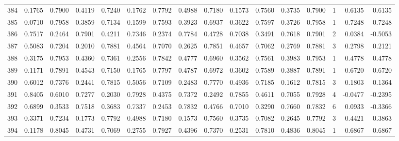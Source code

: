 \begin{tabular}{lrrrrrrrrrrrrrrr}
384 &      0.1765 &  0.7900 &  0.4119 &  0.7240 &  0.1762 &  0.7792 &  0.4988 &  0.7180 &  0.1573 &  0.7560 &   0.3735 &     0.7900 &      1 &                    0.6135 &                     0.6135 \\
385 &      0.0710 &  0.7958 &  0.3859 &  0.7134 &  0.1599 &  0.7593 &  0.3923 &  0.6937 &  0.3622 &  0.7597 &   0.3726 &     0.7958 &      1 &                    0.7248 &                     0.7248 \\
386 &      0.7517 &  0.2464 &  0.7901 &  0.4211 &  0.7346 &  0.2374 &  0.7784 &  0.4728 &  0.7038 &  0.3491 &   0.7618 &     0.7901 &      2 &                    0.0384 &                    -0.5053 \\
387 &      0.5083 &  0.7204 &  0.2010 &  0.7881 &  0.4564 &  0.7070 &  0.2625 &  0.7851 &  0.4657 &  0.7062 &   0.2769 &     0.7881 &      3 &                    0.2798 &                     0.2121 \\
388 &      0.3175 &  0.7953 &  0.4360 &  0.7361 &  0.2556 &  0.7842 &  0.4777 &  0.6960 &  0.3562 &  0.7561 &   0.3983 &     0.7953 &      1 &                    0.4778 &                     0.4778 \\
389 &      0.1171 &  0.7891 &  0.4543 &  0.7150 &  0.1765 &  0.7797 &  0.4787 &  0.6972 &  0.3602 &  0.7589 &   0.3887 &     0.7891 &      1 &                    0.6720 &                     0.6720 \\
390 &      0.6012 &  0.7376 &  0.2441 &  0.7815 &  0.5056 &  0.7109 &  0.2483 &  0.7770 &  0.4936 &  0.7185 &   0.1612 &     0.7815 &      3 &                    0.1803 &                     0.1364 \\
391 &      0.8405 &  0.6010 &  0.7277 &  0.2030 &  0.7928 &  0.4375 &  0.7372 &  0.2492 &  0.7855 &  0.4611 &   0.7055 &     0.7928 &      4 &                   -0.0477 &                    -0.2395 \\
392 &      0.6899 &  0.3533 &  0.7518 &  0.3683 &  0.7337 &  0.2453 &  0.7832 &  0.4766 &  0.7010 &  0.3290 &   0.7660 &     0.7832 &      6 &                    0.0933 &                    -0.3366 \\
393 &      0.3371 &  0.7234 &  0.1773 &  0.7792 &  0.4988 &  0.7180 &  0.1573 &  0.7560 &  0.3735 &  0.7082 &   0.2645 &     0.7792 &      3 &                    0.4421 &                     0.3863 \\
394 &      0.1178 &  0.8045 &  0.4731 &  0.7069 &  0.2755 &  0.7927 &  0.4396 &  0.7370 &  0.2531 &  0.7810 &   0.4836 &     0.8045 &      1 &                    0.6867 &                     0.6867 \\

\end{tabular}
